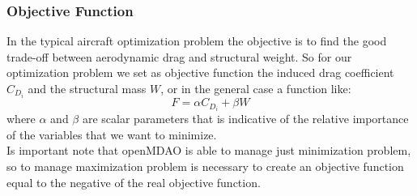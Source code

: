\subsubsection{Objective Function}
In the typical aircraft optimization problem the objective is to find the good trade-off between aerodynamic drag and structural weight. So for our optimization problem we set as objective function the induced drag coefficient $C_{D_i}$ and the structural mass $W$, or in the general case a function like:
\begin{equation*}
F = \alpha C_{D_i} + \beta W
\end{equation*}
where $\alpha$ and $\beta$ are scalar parameters that is indicative of the relative importance of the variables that we want to minimize.\\
Is important note that openMDAO is able to manage just minimization problem, so to manage maximization problem is necessary to create an objective function equal to the negative of the real objective function.
